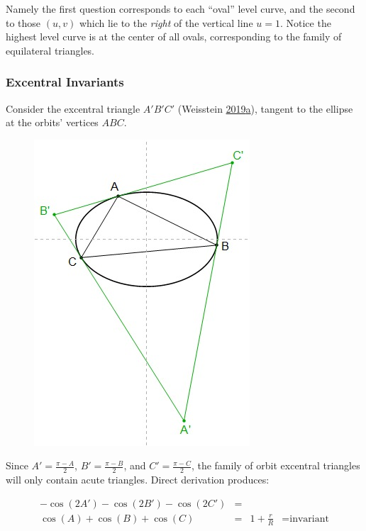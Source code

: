 \documentclass[]{article}
\begin{document}
Namely the first question corresponds to each ``oval'' level curve, and the second to those \((u,v)\) which lie to the \emph{right} of the vertical line \(u=1\). Notice the highest level curve is at the center of all ovals, corresponding to the family of equilateral triangles.

\hypertarget{excentral-invariants}{%
\subsubsection{Excentral Invariants}\label{excentral-invariants}}

Consider the excentral triangle \(A'B'C'\) (Weisstein \protect\hyperlink{ref-mw}{2019}\protect\hyperlink{ref-mw}{a}), tangent to the ellipse at the orbits' vertices \(ABC\).

\begin{figure}[H]

{\centering \includegraphics[width=0.5\linewidth]{pics/extriangle} 

}

\end{figure}

Since \(A'=\frac{\pi-A}{2}\), \(B'=\frac{\pi-B}{2}\), and \(C'=\frac{\pi-C}{2}\), the family of orbit excentral triangles will only contain acute triangles. Direct derivation produces:

\[
\begin{array}{rcll}
-\cos(2A')-\cos(2B')-\cos(2C') & = & \\ \cos(A)+\cos(B)+\cos(C) & = & 1+\frac{r}{R} & = \text{invariant}
\end{array}
\]
\end{document}
